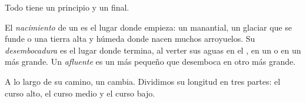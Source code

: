 Todo  tiene un principio y un final.

\begin{definition}\label{def:g5:water-shapes-the-land:source-mouth}
El \emph{nacimiento}
de un  es el lugar donde empieza: un manantial, un glaciar que se funde
o una tierra alta y húmeda donde nacen muchos arroyuelos. Su
\emph{desembocadura} es el lugar donde termina, al
verter sus aguas en el , en un  o en un  más grande. Un
\emph{afluente} es un  más pequeño que desemboca en otro
más grande.
\end{definition}

A lo largo de su camino, un  cambia. Dividimos su longitud en tres
partes: el curso alto, el curso medio y el curso bajo.

